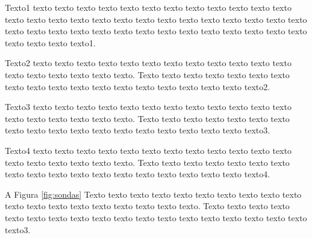     Texto1 texto texto texto texto texto texto texto texto texto texto texto texto texto texto texto texto texto texto texto texto texto texto texto texto texto texto texto texto texto texto texto texto texto texto texto texto texto texto texto texto texto texto texto texto1.

    Texto2 texto texto texto texto texto texto texto texto texto texto texto texto texto texto texto texto texto texto. Texto texto texto texto texto texto texto texto texto texto texto texto texto texto texto texto texto texto texto2.

    Texto3 texto texto texto texto texto texto texto texto texto texto texto texto texto texto texto texto texto texto. Texto texto texto texto texto texto texto texto texto texto texto texto texto texto texto texto texto texto texto3.

    Texto4 texto texto texto texto texto texto texto texto texto texto texto texto texto texto texto texto texto texto. Texto texto texto texto texto texto texto texto texto texto texto texto texto texto texto texto texto texto texto4.

    A Figura \ref{fig:sondas} Texto texto texto texto texto texto texto texto texto texto texto texto texto texto texto texto texto texto texto. Texto texto texto texto texto texto texto texto texto texto texto texto texto texto texto texto texto texto texto3.

	\begin{figure}[h!]
		\centering
		\captionsetup{width=14cm}%
	\end{figure}

